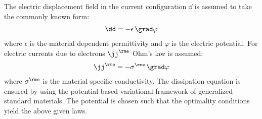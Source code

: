 The electric displacement field in the current configuration $\dd$ is assumed to take the commonly known form: 
\begin{align}
  \dd = -\epsilon \, \grad \varphi
\end{align}
where $\epsilon$ is the material dependent permittivity and $\varphi$ is the electric potential. For electric currents due to electrons $\jj^\rme$ Ohm's law is assumed:
\begin{align}
  \jj^\rme = -\sigma^\rme \, \grad \varphi
\end{align}
where $\sigma^\rme$ is the material specific conductivity. The dissipation equation is ensured by using the potential based variational framework of generalized standard materials. The potential is chosen such that the optimality conditions yield the above given laws. 
